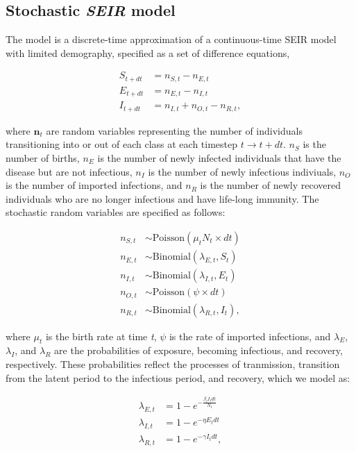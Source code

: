 \documentclass[3p]{elsarticle} %
\begin{document}
\subsection{\texorpdfstring{Stochastic \emph{SEIR}
model}{Stochastic SEIR model}}\label{stochastic-seir-model}

The model is a discrete-time approximation of a continuous-time SEIR
model with limited demography, specified as a set of difference
equations,

\begin{align}
S_{t+dt} &= n_{S,t} - n_{E,t} \\
E_{t+dt} &= n_{E,t} - n_{I,t} \\
I_{t+dt} &= n_{I,t} + n_{O,t} - n_{R,t},
\end{align}

\noindent{}where \(\textbf{n}_t\) are random variables representing the
number of individuals transitioning into or out of each class at each
timestep \(t \rightarrow t+dt\). \(n_{S}\) is the number of births,
\(n_{E}\) is the number of newly infected individuals that have the
disease but are not infectious, \(n_{I}\) is the number of newly
infectious indiviuals, \(n_{O}\) is the number of imported infections,
and \(n_{R}\) is the number of newly recovered individuals who are no
longer infectious and have life-long immunity. The stochastic random
variables are specified as follows:

\begin{align}
n_{S,t} &\sim \text{Poisson}(\mu_t N_t \times dt) \\
n_{E,t} &\sim \text{Binomial}(\lambda_{E,t}, S_{t}) \\
n_{I,t} &\sim \text{Binomial}(\lambda_{I,t}, E_{t}) \\
n_{O,t} &\sim \text{Poisson}(\psi \times dt) \\
n_{R,t} &\sim \text{Binomial}(\lambda_{R,t}, I_{t}),
\end{align}

\noindent{}where \(\mu_t\) is the birth rate at time \emph{t}, \(\psi\)
is the rate of imported infections, and \(\lambda_E\), \(\lambda_I\),
and \(\lambda_R\) are the probabilities of exposure, becoming
infectious, and recovery, respectively. These probabilities reflect the
processes of tranmission, transition from the latent period to the
infectious period, and recovery, which we model as:

\begin{align}
\lambda_{E,t} &= 1 - e^{-\frac{\beta_t I_t dt}{N_t}} \\
\lambda_{I,t} &= 1 - e^{-\eta E_{t} dt} \\
\lambda_{R,t} &= 1 - e^{-\gamma I_{t} dt},
\end{align}
\end{document}

